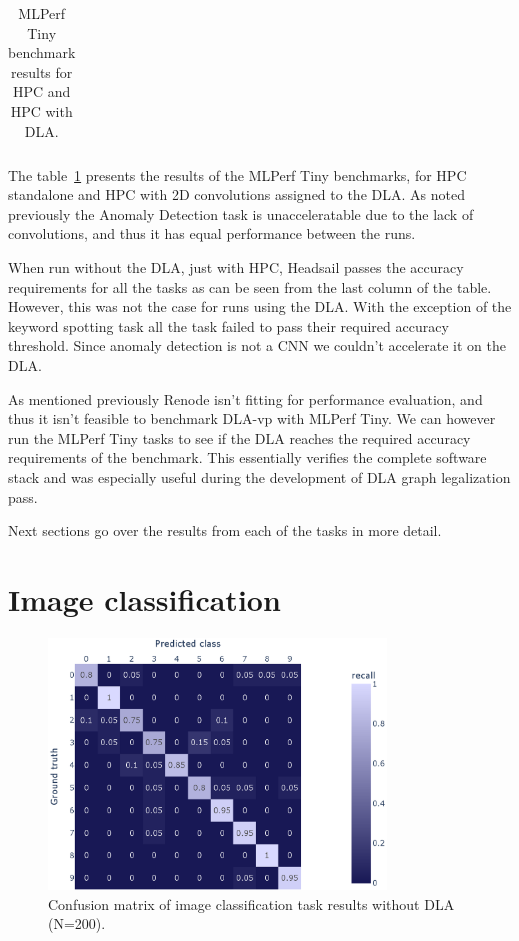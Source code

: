 \documentclass[12pt,a4paper,english
]{tunithesis}
\begin{document}
\begin{table}[h]
\begin{tabular}{|l|l|c|c|c|c|}
\end{tabular}
\caption{MLPerf Tiny benchmark results for HPC and HPC with DLA.}
\label{tab:benchmark-results}
\end{table}

The table~\ref{tab:benchmark-results} presents the results of the MLPerf Tiny benchmarks, for HPC standalone and HPC with 2D convolutions assigned to the DLA. As noted previously the Anomaly Detection task is unacceleratable due to the lack of convolutions, and thus it has equal performance between the runs.

When run without the DLA, just with HPC, Headsail passes the accuracy requirements for all the tasks as can be seen from the last column of the table. However, this was not the case for runs using the DLA. With the exception of the keyword spotting task all the task failed to pass their required accuracy threshold. Since anomaly detection is not a CNN we couldn't accelerate it on the DLA.

As mentioned previously Renode isn't fitting for performance evaluation, and thus it isn't feasible to benchmark DLA-vp with MLPerf Tiny. We can however run the MLPerf Tiny tasks to see if the DLA reaches the required accuracy requirements of the benchmark. This essentially verifies the complete software stack and was especially useful during the development of DLA graph legalization pass.

Next sections go over the results from each of the tasks in more detail.

\section{Image classification}
\begin{figure}[h]
  \centering
  \includegraphics[width=0.8\textwidth]{img/ic_200_no_acc.eps}
  \caption{Confusion matrix of image classification task results without DLA (N=200).}
  \label{fig:ic-results-no-acc}
\end{figure}
\end{document}
